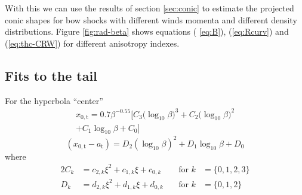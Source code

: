 With this we can use the results of section \ref{sec:conic} to estimate the projected conic shapes for bow shocks with different winds 
momenta and different density distributions. Figure \ref{fig:rad-beta} shows equations ( \ref{eq:B}), (\ref{eq:Rcurv}) and (\ref{eq:thc-CRW}) for different anisotropy indexes. 


\subsection{Fits to the tail}
\label{sec:fits-tail}


For the hyperbola ``center''
\begin{multline}
  \label{eq:tail-analytic-x0}
  x_{0,\mathrm{t}} = 0.7 \beta^{-0.55} \biggl[
    C_3 \bigl(\log_{10}\beta\bigr)^3 + C_2 \bigl(\log_{10}\beta\bigr)^2 
  \\ + C_1 \log_{10}\beta + C_0
  \biggr]
\end{multline}
\begin{equation}
  \label{eq:tail-analytic-x0-minus-a}
  (x_{0,\mathrm{t}} - a_{\mathrm{t}}) = D_2 (\log_{10}\beta)^2 + D_1 \log_{10}\beta + D_0
\end{equation}
where
\begin{alignat}{2}
  \label{eq:tail-analytic-coeffs-c}
  C_k &= c_{2,k} \xi^2 + c_{1,k} \xi + c_{0,k} &\quad \text{for\ } k &= \{0, 1, 2, 3\} \\
  \label{eq:tail-analytic-coeffs-d}
  D_k &= d_{2,k} \xi^2 + d_{1,k} \xi + d_{0,k} &\quad \text{for\ } k &= \{0, 1, 2\}
\end{alignat}


\newcommand\iso{\ensuremath{^{\mathrm{iso}}}}

